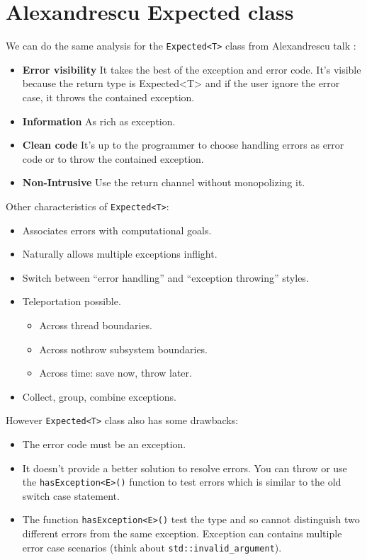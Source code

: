 \documentclass[a4paper,10pt]{article}
\newcommand{\cpp}[1]{\lstinline{#1}}
\begin{document}
\section{Alexandrescu Expected class}

We can do the same analysis for the \cpp{Expected<T>} class from Alexandrescu talk \cite{AlexandrescuExpected}:

\begin{itemize}
 \item \textbf{Error visibility} It takes the best of the exception and error code. It's visible because the return type is Expected<T> and if the user ignore the error case, it throws the contained exception.
 \item \textbf{Information} As rich as exception.
 \item \textbf{Clean code} It's up to the programmer to choose handling errors as error code or to throw the contained exception.
 \item \textbf{Non-Intrusive} Use the return channel without monopolizing it.
\end{itemize}

\noindent
Other characteristics of \cpp{Expected<T>}:

\begin{itemize}
 \item Associates errors with computational goals.
 \item Naturally allows multiple exceptions inflight.
 \item Switch between ``error handling'' and ``exception throwing'' styles.
 \item Teleportation possible.
 \begin{itemize}
  \item Across thread boundaries.
  \item Across nothrow subsystem boundaries.
  \item Across time: save now, throw later.
 \end{itemize}
 \item Collect, group, combine exceptions.
\end{itemize}

\noindent
However \cpp{Expected<T>} class also has some drawbacks:
\begin{itemize}
 \item The error code must be an exception.
 \item It doesn't provide a better solution to resolve errors. You can throw or use the \cpp{hasException<E>()} function to test errors which is similar to the old switch case statement.
 \item The function \cpp{hasException<E>()} test the type and so cannot distinguish two different errors from the same exception. Exception can contains multiple error case scenarios (think about \cpp{std::invalid_argument}).
\end{itemize}
\end{document}
